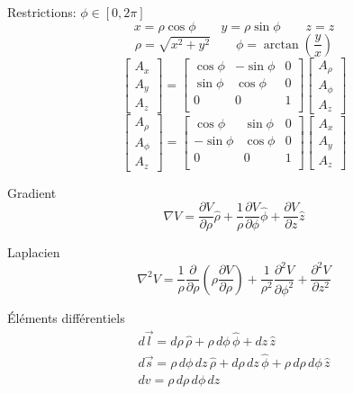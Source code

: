 \documentclass[10pt,landscape]{article}
\newcommand{\extraline}{\vspace{1em}}
\newcommand{\uvec}[1]{\ensuremath{{\hat{#1}}}}
\begin{document}
\begin{multicols}{3}
Restrictions: $\phi\in[0,2\pi]$
\[ x = \rho\cos\phi \qquad y = \rho\sin\phi \qquad z=z  \]
\[ \rho = \sqrt{x^2 + y^2} \qquad \phi = \arctan\left(\frac{y}{x}\right) \]
%
\[
\begin{bmatrix}
	A_x \\ A_y \\ A_z
\end{bmatrix}
=
\begin{bmatrix}
	\cos\phi & -\sin\phi & 0 \\
	\sin\phi & \cos\phi & 0 \\
	0 & 0 & 1 \\
\end{bmatrix}
\begin{bmatrix}
	A_\rho \\ A_\phi \\ A_z
\end{bmatrix}
\]
\[
\begin{bmatrix}
	A_\rho \\ A_\phi \\ A_z
\end{bmatrix}
=
\begin{bmatrix}
	\cos\phi & \sin\phi & 0 \\
	-\sin\phi & \cos\phi & 0 \\
	0 & 0 & 1 \\
\end{bmatrix}
\begin{bmatrix}
	A_x \\ A_y \\ A_z
\end{bmatrix}
\]

\extraline
Gradient
\[ \nabla V = \frac{\partial V}{\partial \rho}\uvec{\rho} + \frac{1}{\rho}\frac{\partial V}{\partial \phi}\uvec{\phi} + \frac{\partial V}{\partial z}\uvec{z} \]

Laplacien
\[ \nabla^2 V = 
\frac{1}{\rho} \frac{\partial}{\partial \rho} \left( \rho\frac{\partial V}{\partial \rho} \right)
+ \frac{1}{\rho^2}\frac{\partial^2 V}{\partial \phi^2}
+ \frac{\partial^2 V}{\partial z^2} \]

Éléments différentiels
\begin{gather*}
d\vec{l} = d\rho\,\uvec{\rho} + \rho\,d\phi\,\uvec{\phi} + dz\,\uvec{z} \\
d\vec{s} = \rho\,d\phi\,dz\,\uvec{\rho} + d\rho\,dz\,\uvec{\phi} + \rho\,d\rho\,d\phi\,\uvec{z} \\
dv = \rho\,d\rho\,d\phi\,dz
\end{gather*}


\end{multicols}
\end{document}
